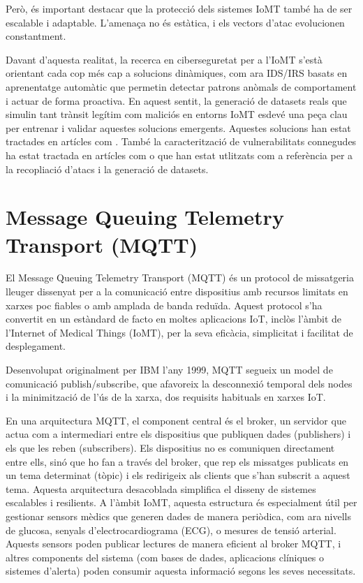   Però, és important destacar que la protecció dels sistemes IoMT també ha de ser escalable i adaptable. L’amenaça no és estàtica, i els vectors d’atac evolucionen constantment. 
 
  Davant d’aquesta realitat, la recerca en ciberseguretat per a l’IoMT s’està orientant cada cop més cap a solucions dinàmiques, com ara IDS/IRS basats en aprenentatge automàtic que permetin detectar patrons anòmals de comportament i actuar de forma proactiva. En aquest sentit, la generació de datasets reals que simulin tant trànsit legítim com maliciós en entorns IoMT esdevé una peça clau per entrenar i validar aquestes solucions emergents. Aquestes solucions han estat tractades en artícles com \cite{iotthreadsexp}. També la caracterització de vulnerabilitats connegudes ha estat tractada en artícles com \cite{ciciomtexp} o \cite{lowrateDDoSexp} que han estat utlitzats com a referència per a la recopliació d'atacs i la generació de datasets.
  
  \section{Message Queuing Telemetry Transport (MQTT)}
  \label{sec:MQTT}
  El Message Queuing Telemetry Transport (MQTT) és un protocol de missatgeria lleuger dissenyat per a la comunicació entre dispositius amb recursos limitats en xarxes poc fiables o amb amplada de banda reduïda. Aquest protocol s’ha convertit en un estàndard de facto en moltes aplicacions IoT, inclòs l’àmbit de l’Internet of Medical Things (IoMT), per la seva eficàcia, simplicitat i facilitat de desplegament.
  
  Desenvolupat originalment per IBM l’any 1999, MQTT segueix un model de comunicació publish/subscribe, que afavoreix la desconnexió temporal dels nodes i la minimització de l’ús de la xarxa, dos requisits habituals en xarxes IoT. 
  
  En una arquitectura MQTT, el component central és el broker, un servidor que actua com a intermediari entre els dispositius que publiquen dades (publishers) i els que les reben (subscribers). Els dispositius no es comuniquen directament entre ells, sinó que ho fan a través del broker, que rep els missatges publicats en un tema determinat (tòpic) i els redirigeix als clients que s’han subscrit a aquest tema. Aquesta arquitectura desacoblada simplifica el disseny de sistemes escalables i resilients. A l’àmbit IoMT, aquesta estructura és especialment útil per gestionar sensors mèdics que generen dades de manera periòdica, com ara nivells de glucosa, senyals d’electrocardiograma (ECG), o mesures de tensió arterial. Aquests sensors poden publicar lectures de manera eficient al broker MQTT, i altres components del sistema (com bases de dades, aplicacions clíniques o sistemes d’alerta) poden consumir aquesta informació segons les seves necessitats. 
  
